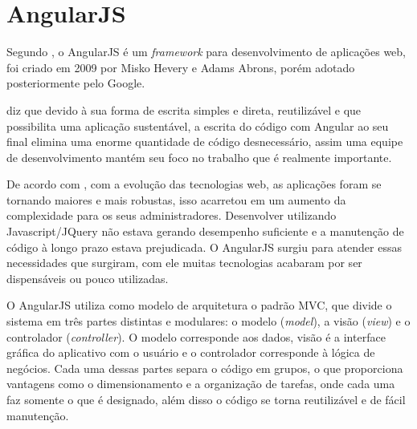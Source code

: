\section{AngularJS}
	\par Segundo , o AngularJS é um \textit{framework} para desenvolvimento de aplicações web, foi criado em 2009 por Misko Hevery e Adams Abrons, porém adotado posteriormente pelo Google.
	\par {} diz que devido à sua forma de escrita simples e direta, reutilizável e que possibilita uma aplicação sustentável, a escrita do código com Angular ao seu final elimina uma enorme quantidade de código desnecessário, assim uma equipe de desenvolvimento mantém seu foco no trabalho que é realmente importante.
	\par De acordo com , com a evolução das tecnologias web, as aplicações foram se tornando maiores e mais robustas, isso acarretou em um aumento da complexidade para os seus administradores. Desenvolver utilizando Javascript/JQuery não estava gerando desempenho suficiente e a manutenção de código à longo prazo estava prejudicada. O AngularJS surgiu para atender essas necessidades que surgiram, com ele muitas tecnologias acabaram por ser dispensáveis ou pouco utilizadas.
	\par O AngularJS utiliza como modelo de arquitetura o padrão MVC, que divide o sistema em três partes distintas e modulares: o modelo (\textit{model}), a visão (\textit{view}) e o controlador (\textit{controller}). O modelo corresponde aos dados, visão é a interface gráfica do aplicativo com o usuário e o controlador corresponde à lógica de negócios. Cada uma dessas partes separa o código em grupos, o que proporciona vantagens como o dimensionamento e a organização de tarefas, onde cada uma faz somente o que é designado, além disso o código se torna reutilizável e de fácil manutenção. 
	
